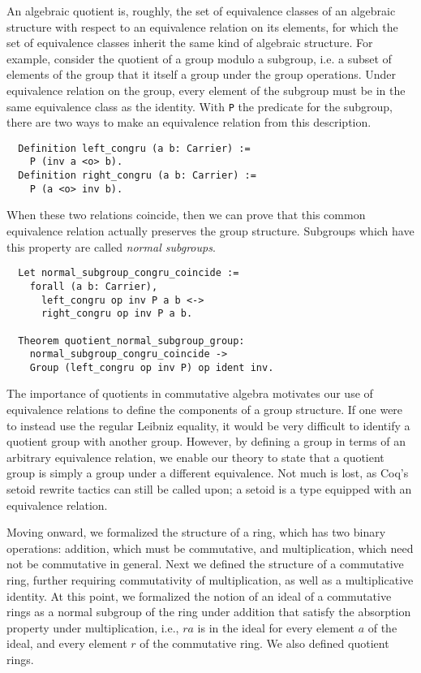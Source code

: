 \documentclass{article}
\begin{document}
An algebraic quotient is, roughly, the set of equivalence classes of an algebraic structure with respect to an equivalence relation on its elements, for which the set of equivalence classes inherit the same kind of algebraic structure. 
For example, consider the quotient of a group modulo a subgroup, i.e. a subset of elements of the group that it itself a group under the group operations. 
Under equivalence relation on the group, every element of the subgroup must be in the same equivalence class as the identity.  
With \texttt{P} the predicate for the subgroup, there are two ways to
make an equivalence relation from this description.

\begin{verbatim}
  Definition left_congru (a b: Carrier) :=
    P (inv a <o> b).
  Definition right_congru (a b: Carrier) :=
    P (a <o> inv b).
\end{verbatim}

When these two relations coincide, then we can prove that this common equivalence
relation actually preserves the group structure. Subgroups which have this
property are called \emph{normal subgroups}.

\begin{verbatim}
  Let normal_subgroup_congru_coincide :=
    forall (a b: Carrier),
      left_congru op inv P a b <->
      right_congru op inv P a b.

  Theorem quotient_normal_subgroup_group:
    normal_subgroup_congru_coincide ->
    Group (left_congru op inv P) op ident inv.
\end{verbatim}

The importance of quotients in commutative algebra motivates our use of equivalence relations to define the
components of a group structure. 
If one were to instead use the regular Leibniz equality,
it would be very difficult to identify a quotient group with another
group. 
However, by  defining a group in terms of an arbitrary equivalence relation, we enable our theory to state that a quotient group is
simply a group under a different equivalence. 
Not much is lost,  as Coq's setoid rewrite tactics can still be called upon; 
a setoid is a type equipped
with an equivalence relation.

Moving onward, we formalized the structure of a ring, which has two binary
operations:
addition, which must be commutative, and multiplication, which need not be commutative in general.
Next we defined the structure of a commutative ring, further requiring commutativity of multiplication, as well as a multiplicative identity. 
At this point, we formalized the notion of an ideal of a commutative rings as a normal subgroup  
of the ring under
addition that satisfy the absorption property under multiplication, i.e., \(r a\) is in
the ideal for every element \(a\) of the ideal, and every element \(r\) of the commutative ring.
We also defined quotient rings. 
\end{document}

